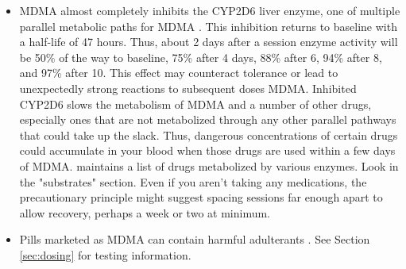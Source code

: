 \documentclass[12pt,letterpaper]{book}
\begin{document}
\begin{itemize}
    \item MDMA almost completely inhibits the CYP2D6 liver enzyme, one of multiple parallel metabolic paths for MDMA \cite{omathunaCYP}. This inhibition returns to baseline with a half-life of 47 hours. Thus, about 2 days after a session enzyme activity will be 50\% of the way to baseline, 75\% after 4 days, 88\% after 6, 94\% after 8, and 97\% after 10. This effect may counteract tolerance or lead to unexpectedly strong reactions to subsequent doses MDMA. Inhibited CYP2D6 slows the metabolism of MDMA and a number of other drugs, especially ones that are not metabolized through any other parallel pathways that could take up the slack. Thus, dangerous concentrations of certain drugs could accumulate in your blood when those drugs are used within a few days of MDMA. \textcite{flockartTable} maintains a list of drugs metabolized by various enzymes. Look in the "substrates" section. Even if you aren't taking any medications, the precautionary principle might suggest spacing sessions far enough apart to allow recovery, perhaps a week or two at minimum.
    \item Pills marketed as MDMA can contain harmful adulterants \cite{saleemiAdulterants}. See Section \ref{sec:dosing} for testing information.
\end{itemize}
\end{document}
